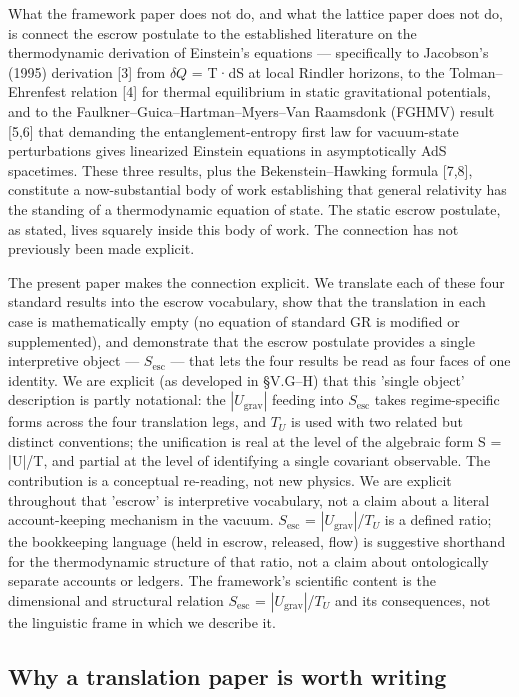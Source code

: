 \documentclass[11pt]{article}
\begin{document}
What the framework paper does not do, and what the lattice paper does
not do, is connect the escrow postulate to the established literature on
the thermodynamic derivation of Einstein's equations --- specifically
to Jacobson's (1995) derivation [3] from $\delta Q$ = T·dS at local Rindler
horizons, to the Tolman--Ehrenfest relation [4] for thermal
equilibrium in static gravitational potentials, and to the
Faulkner--Guica--Hartman--Myers--Van Raamsdonk (FGHMV) result [5,6]
that demanding the entanglement-entropy first law for vacuum-state
perturbations gives linearized Einstein equations in asymptotically AdS
spacetimes. These three results, plus the Bekenstein--Hawking formula
[7,8], constitute a now-substantial body of work establishing that
general relativity has the standing of a thermodynamic equation of
state. The static escrow postulate, as stated, lives squarely inside
this body of work. The connection has not previously been made explicit.

The present paper makes the connection explicit. We translate each of
these four standard results into the escrow vocabulary, show that the
translation in each case is mathematically empty (no equation of
standard GR is modified or supplemented), and demonstrate that the
escrow postulate provides a single interpretive object --- $S_{\mathrm{esc}}$ ---
that lets the four results be read as four faces of one identity. We are
explicit (as developed in §V.G--H) that this 'single object'
description is partly notational: the $|U_{\mathrm{grav}}|$ feeding into $S_{\mathrm{esc}}$
takes regime-specific forms across the four translation legs, and $T_{U}$ is
used with two related but distinct conventions; the unification is real
at the level of the algebraic form S = |U|/T, and partial at the level
of identifying a single covariant observable. The contribution is a
conceptual re-reading, not new physics. We are explicit throughout that
'escrow' is interpretive vocabulary, not a claim about a literal
account-keeping mechanism in the vacuum. $S_{\mathrm{esc}}$ = $|U_{\mathrm{grav}}|$/$T_{U}$ is a
defined ratio; the bookkeeping language (held in escrow, released, flow)
is suggestive shorthand for the thermodynamic structure of that ratio,
not a claim about ontologically separate accounts or ledgers. The
framework's scientific content is the dimensional and structural
relation $S_{\mathrm{esc}}$ = $|U_{\mathrm{grav}}|$/$T_{U}$ and its consequences, not the linguistic
frame in which we describe it.


\subsection{Why a translation paper is worth writing}
\end{document}
